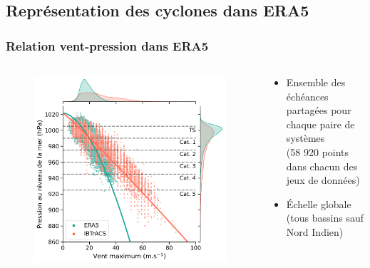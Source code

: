 \documentclass[aspectratio=169, usepdftitle=false, xcolor={dvipsnames}, 9pt,table]{beamer}
\begin{document}
 \subsection[Représentation des cyclones dans ERA5]{Représentation des cyclones dans ERA5}
 \begin{frame}
     \frametitle{Relation vent-pression dans ERA5}
     \begin{columns}
         \begin{column}{0.5\textwidth}
             \begin{figure}
                 \centering
                 \includegraphics[width=\textwidth]{Figures/ERA5_PV_myVTU.png}
             \end{figure}
         \end{column}
         \begin{column}{0.5\textwidth}
             \footnotesize
             \setlength{\leftmargini}{3.5ex}
             \vspace{1.25ex}
             \begin{examples}[Méthodologie] 
                 \begin{itemize}
                     \item Ensemble des échéances partagées pour chaque paire de systèmes\\(58 920 points dans chacun des jeux de données)
                     \item Échelle globale (tous bassins sauf Nord Indien)

\end{itemize}
\end{examples}
\end{column}
\end{columns}
\end{frame}
\end{document}
